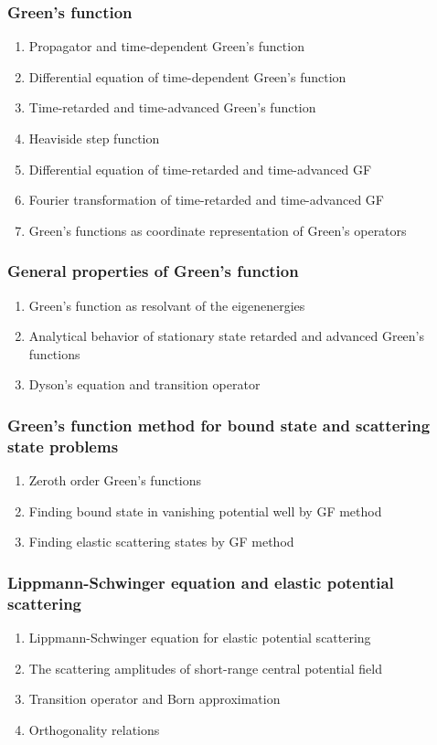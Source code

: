 \documentclass[12pt]{article}
\numberwithin{equation}{section}
\begin{document}
\subsubsection{Green's function}
\begin{enumerate}
\item Propagator and time-dependent Green's function
\item Differential equation of time-dependent Green's function
\item Time-retarded and time-advanced Green's function
\item Heaviside step function
\item Differential equation of time-retarded and time-advanced GF
\item Fourier transformation of time-retarded and time-advanced GF
\item Green's functions as coordinate representation of Green's operators
\end{enumerate}
\subsubsection{General properties of Green's function}
\begin{enumerate}
\item Green's function as resolvant of the eigenenergies
\item Analytical behavior of stationary state retarded and advanced Green's functions
\item Dyson's equation and transition operator
\end{enumerate}
\subsubsection{Green's function method for bound state and scattering state problems}
\begin{enumerate}
\item Zeroth order Green's functions
\item Finding bound state in vanishing potential well by GF method
\item Finding elastic scattering states by GF method
\end{enumerate}
\subsubsection{Lippmann-Schwinger equation and elastic potential scattering}
\begin{enumerate}
\item Lippmann-Schwinger equation for elastic potential scattering
\item The scattering amplitudes of short-range central potential field
\item Transition operator and Born approximation
\item Orthogonality relations
\end{enumerate}
\end{document}
